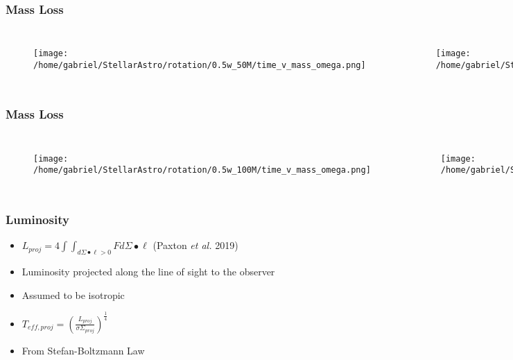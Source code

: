 \documentclass{beamer}
\begin{document}
\begin{frame}
\frametitle{Mass Loss}
        \begin{columns}[c]
\begin{figure}
    \begin{center}
      \texttt{[image: /home/gabriel/StellarAstro/rotation/0.5w\_50M/time\_v\_mass\_omega.png]}
    \end{center}
  \end{figure}

        \begin{figure}
    \begin{center}
      \texttt{[image: /home/gabriel/StellarAstro/rotation/0.9w\_50M/time\_v\_mass\_omega.png]}
    \end{center}
  \end{figure}

        \end{columns}
\end{frame}



\begin{frame}
\frametitle{Mass Loss}
        \begin{columns}[c]
\begin{figure}
    \begin{center}
      \texttt{[image: /home/gabriel/StellarAstro/rotation/0.5w\_100M/time\_v\_mass\_omega.png]}
    \end{center}
  \end{figure}

        \begin{figure}
    \begin{center}
      \texttt{[image: /home/gabriel/StellarAstro/rotation/0.9w\_100M/time\_v\_mass\_omega.png]}
    \end{center}
  \end{figure}

        \end{columns}
\end{frame}



\begin{frame}
\frametitle{Luminosity}
  \begin{itemize}
	  \item $L_{proj} = 4\int \int_{d\Sigma \bullet \ell >0} Fd\Sigma \bullet \ell$ (Paxton \textit{et al.} 2019)
    \item Luminosity projected along the line of sight to the observer 
    \item Assumed to be isotropic
    \item $T_{eff,proj} = (\frac{L_{proj}}{\sigma \Sigma_{proj}})^\frac{1}{4} $
    \item From Stefan-Boltzmann Law

  \end{itemize}
\end{frame}
\end{document}
